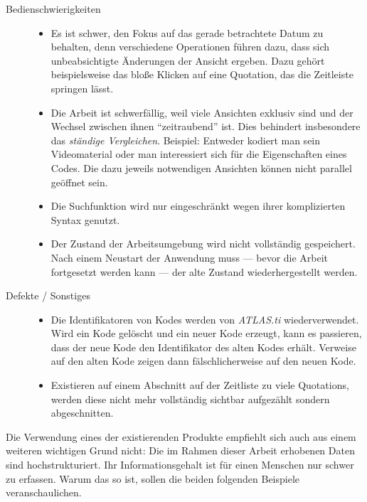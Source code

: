 \begin{description}
  \item[Bedienschwierigkeiten] \hfill
  \begin{itemize}
    \item Es ist schwer, den Fokus auf das gerade betrachtete Datum zu behalten, denn verschiedene Operationen führen dazu, dass sich unbeabsichtigte Änderungen der Ansicht ergeben. Dazu gehört beispielsweise das bloße Klicken auf eine Quotation, das die Zeitleiste springen lässt.
    \item Die Arbeit ist schwerfällig, weil viele Ansichten exklusiv sind und der Wechsel zwischen ihnen ``zeitraubend'' ist. Dies behindert insbesondere das \textit{ständige Vergleichen}. Beispiel: Entweder kodiert man sein Videomaterial oder man interessiert sich für die Eigenschaften eines Codes. Die dazu jeweils notwendigen Ansichten können nicht parallel geöffnet sein.
    \item Die Suchfunktion wird nur eingeschränkt wegen ihrer komplizierten Syntax genutzt.
    \item Der Zustand der Arbeitsumgebung wird nicht vollständig gespeichert. Nach einem Neustart der Anwendung muss --- bevor die Arbeit fortgesetzt werden kann --- der alte Zustand wiederhergestellt werden.  
  \end{itemize}
  
  \item[Defekte / Sonstiges] \hfill
  \begin{itemize}
  	\item Die Identifikatoren von Kodes werden von \textit{ATLAS.ti} wiederverwendet. Wird ein Kode gelöscht und ein neuer Kode erzeugt, kann es passieren, dass der neue Kode den Identifikator des alten Kodes erhält. Verweise auf den alten Kode zeigen dann fälschlicherweise auf den neuen Kode. 
    \item Existieren auf einem Abschnitt auf der Zeitliste zu viele Quotations, werden diese nicht mehr vollständig sichtbar aufgezählt sondern abgeschnitten.
  \end{itemize}
\end{description}

Die Verwendung eines der existierenden Produkte empfiehlt sich auch aus einem weiteren wichtigen Grund nicht: Die im Rahmen dieser Arbeit erhobenen Daten sind hochstrukturiert. Ihr Informationsgehalt ist für einen Menschen nur schwer zu erfassen. Warum das so ist, sollen die beiden folgenden Beispiele veranschaulichen.



